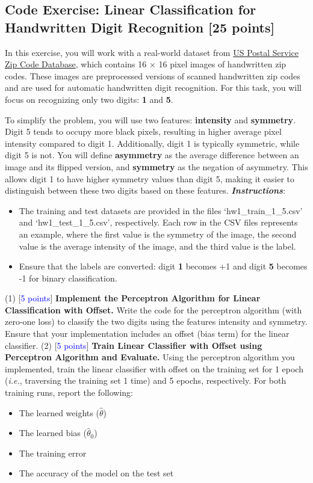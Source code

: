 \documentclass[11pt]{article}
\begin{document}
\subsection{Code Exercise: Linear Classification for Handwritten Digit Recognition [25 points]}
In this exercise, you will work with a real-world dataset from \href{http://www.unitedstateszipcodes.org/zip-code-database}{US Postal Service Zip Code Database}, which contains 16 $\times$ 16 pixel images of handwritten zip codes. These images are preprocessed versions of scanned handwritten zip codes and are used for automatic handwritten digit recognition. For this task, you will focus on recognizing only two digits: \textbf{1} and \textbf{5}.

To simplify the problem, you will use two features: \textbf{intensity}  and \textbf{symmetry}. Digit 5 tends to occupy more black pixels, resulting in higher average pixel intensity compared to digit 1. Additionally, digit 1 is typically symmetric, while digit 5 is not. You will define \textbf{asymmetry} as the average difference between an image and its flipped version, and \textbf{symmetry} as the negation of asymmetry. This allows digit 1 to have higher symmetry values than digit 5, making it easier to distinguish between these two digits based on these features.
\newline
\textbf{\textit{Instructions}}:
\begin{itemize}
	\item The training and test datasets are provided in the files `hw1\_train\_1\_5.csv' and `hw1\_test\_1\_5.csv', respectively. Each row in the CSV files represents an example, where the first value is the symmetry of the image, the second value is the average intensity of the image, and the third value is the label.
	\item Ensure that the labels are converted: digit \textbf{1} becomes +1 and digit \textbf{5} becomes -1 for binary classification.
\end{itemize}

\noindent (1) [\textcolor{blue}{5 points}] \textbf{Implement the Perceptron Algorithm for Linear Classification with Offset.} Write the code for the perceptron algorithm (with zero-one loss) to classify the two digits using the features intensity and symmetry. Ensure that your implementation includes an offset (bias term) for the linear classifier.
\newline
\noindent (2) [\textcolor{blue}{5 points}] \textbf{Train Linear Classifier with Offset using Perceptron Algorithm and Evaluate.}
Using the perceptron algorithm you implemented, train the linear classifier with offset on the training set for 1 epoch (\textit{i.e.}, traversing the training set 1 time) and 5 epochs, respectively. For both training runs, report the following:
\begin{itemize}
	\item The learned weights ($\hat{\theta}$)
	\item The learned bias ($\hat{\theta}_0$)
	\item The training error
	\item The accuracy of the model on the test set 
\end{itemize}
\end{document}
